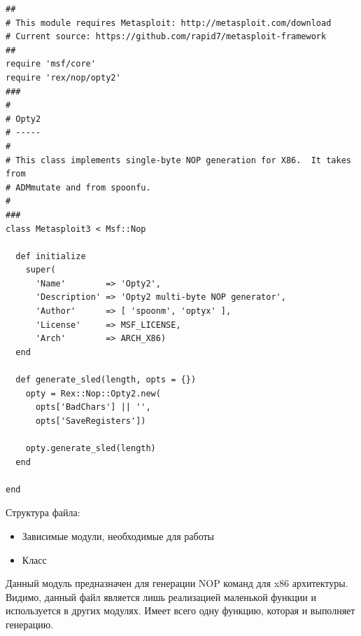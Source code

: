 \documentclass[10pt,a4paper]{article}
\begin{document}
\begin{lstlisting}
##
# This module requires Metasploit: http://metasploit.com/download
# Current source: https://github.com/rapid7/metasploit-framework
##
require 'msf/core'
require 'rex/nop/opty2'
###
#
# Opty2
# -----
#
# This class implements single-byte NOP generation for X86.  It takes from
# ADMmutate and from spoonfu.
#
###
class Metasploit3 < Msf::Nop

  def initialize
    super(
      'Name'        => 'Opty2',
      'Description' => 'Opty2 multi-byte NOP generator',
      'Author'      => [ 'spoonm', 'optyx' ],
      'License'     => MSF_LICENSE,
      'Arch'        => ARCH_X86)
  end

  def generate_sled(length, opts = {})
    opty = Rex::Nop::Opty2.new(
      opts['BadChars'] || '',
      opts['SaveRegisters'])

    opty.generate_sled(length)
  end

end
\end{lstlisting}

Структура файла: 

\begin{itemize}
\item Зависимые модули, необходимые для работы
\item Класс
\end{itemize}

Данный модуль предназначен для генерации NOP команд для x86 архитектуры.\\
Видимо, данный файл является лишь реализацией маленькой функции и используется  в других модулях. Имеет всего одну функцию, которая и выполняет генерацию.
\end{document}

